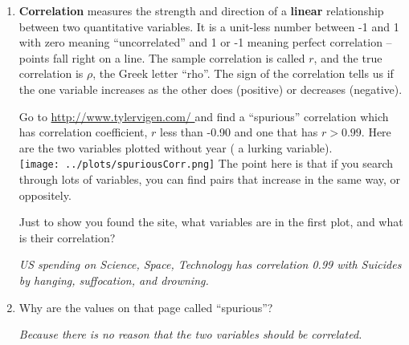 \begin{enumerate}
\begin{enumerate}
\begin{key}
  {\it 235}
\end{key} 
Any other line will have larger SSE.
\end{enumerate}

  \subsection{ Correlation}

  \item {\bf Correlation} measures the strength and direction of a {\bf
  linear} relationship between two quantitative variables. It is a
unit-less number between -1 and 1 with zero meaning ``uncorrelated'' and
1 or -1 meaning perfect correlation -- points fall right on a
line. The sample correlation is called $r$, and the true correlation
is $\rho$, the Greek letter ``rho''. 
 The sign  of the correlation tells us if the one variable
 increases as the other does (positive) or decreases (negative).

   Go to  \url{http://www.tylervigen.com/ } and find a
    ``spurious'' correlation which has correlation coefficient, $r$ less
    than -0.90 and one that has $r > 0.99$.  Here are the two
    variables plotted without year ( a lurking variable).\\
\texttt{[image: ../plots/spuriousCorr.png]}
    The point here is that if you search through lots of variables,
    you can find pairs that increase in the same way, or oppositely.

    Just to show you found the site, what variables are in the first
    plot, and what is their correlation?
\begin{students}
 \vspace{1cm}      
\end{students}

\begin{key}
  {\it  US spending on Science, Space, Technology has correlation 0.99
  with Suicides by hanging, suffocation, and drowning.}
\end{key}

\item Why are the values on that page called ``spurious''?
\begin{students}
 \vspace{1cm}      
\end{students}

\begin{key}
  {\it Because there is no reason that the two variables should be
    correlated. }
\end{key}


\end{enumerate}
